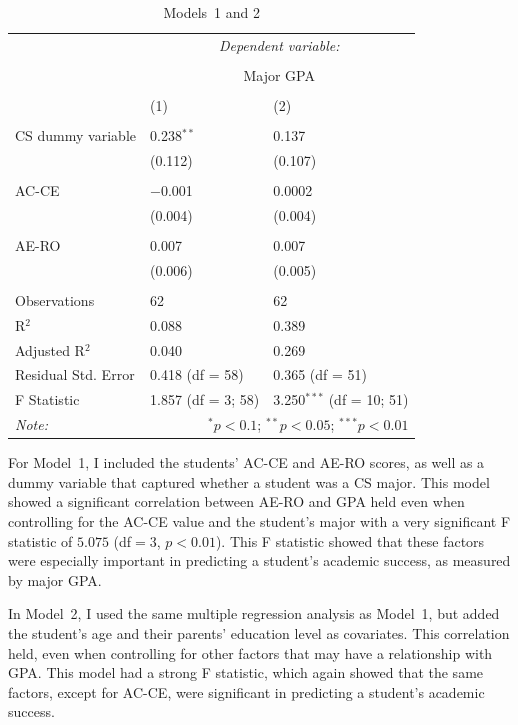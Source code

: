 \begin{table}[!htbp]
  \centering
  \caption{Models~1 and 2}
  \label{tab:models12}
  \begin{tabular}{@{\extracolsep{5pt}}lll}
  \toprule
   & \multicolumn{2}{c}{\textit{Dependent variable:}} \\
  \cline{2-3}
  \\[-1.8ex] & \multicolumn{2}{c}{Major GPA} \\
  \\[-1.8ex] & (1) & (2)\\
  \hline \\[-1.8ex]
  CS dummy variable & 0.238$^{**}$ & 0.137 \\
    & (0.112) & (0.107) \\
    & & \\
  AC-CE & $-$0.001 & 0.0002 \\
    & (0.004) & (0.004) \\
    & & \\
  AE-RO & 0.007 & 0.007 \\
    & (0.006) & (0.005) \\
    & & \\
  \midrule
  Observations & 62 & 62 \\
  R$^{2}$ & 0.088 & 0.389 \\
  Adjusted R$^{2}$ & 0.040 & 0.269 \\
  Residual Std. Error & 0.418 (df = 58) & 0.365 (df = 51) \\
  F Statistic & 1.857 (df = 3; 58) & 3.250$^{***}$ (df = 10; 51) \\
  \bottomrule
  \textit{Note:}  & \multicolumn{2}{r}{$^{*}p<0.1$; $^{**}p<0.05$; $^{***}p<0.01$} \\
  \end{tabular}
\end{table}

For Model~1, I included the students' AC-CE and AE-RO scores, as well as a dummy variable that captured whether a student was a CS major. This model showed a significant correlation between AE-RO and GPA held even when controlling for the AC-CE value and the student's major with a very significant F statistic of $5.075$ (df$=3$, $p<0.01$). This F statistic showed that these factors were especially important in predicting a student's academic success, as measured by major GPA.

In Model~2, I used the same multiple regression analysis as Model~1, but added the student's age and their parents' education level as covariates. This correlation held, even when controlling for other factors that may have a relationship with GPA. This model had a strong F statistic, which again showed that the same factors, except for AC-CE, were significant in predicting a student's academic success.

